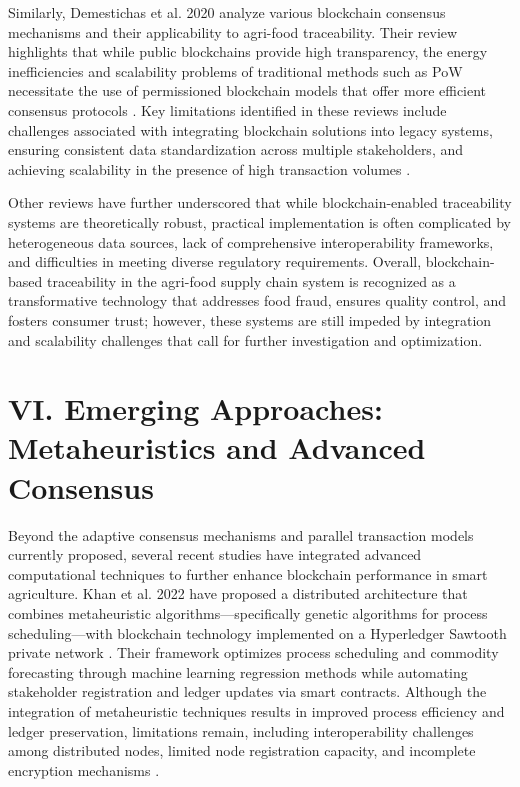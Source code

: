 \documentclass[12pt,onecolumn]{IEEEtran} %
\begin{document}
Similarly, Demestichas et al. 2020 analyze various blockchain consensus mechanisms and their applicability to agri-food traceability. Their review highlights that while public blockchains provide high transparency, the energy inefficiencies and scalability problems of traditional methods such as PoW necessitate the use of permissioned blockchain models that offer more efficient consensus protocols \cite{demestichas2020blockchaininagriculture}. Key limitations identified in these reviews include challenges associated with integrating blockchain solutions into legacy systems, ensuring consistent data standardization across multiple stakeholders, and achieving scalability in the presence of high transaction volumes \cite{demestichas2020blockchaininagriculture}.

Other reviews \cite{demestichas2020blockchaininagriculture, chandan2023achievingunsdgs} have further underscored that while blockchain-enabled traceability systems are theoretically robust, practical implementation is often complicated by heterogeneous data sources, lack of comprehensive interoperability frameworks, and difficulties in meeting diverse regulatory requirements. Overall, blockchain-based traceability in the agri-food supply chain system is recognized as a transformative technology that addresses food fraud, ensures quality control, and fosters consumer trust; however, these systems are still impeded by integration and scalability challenges that call for further investigation and optimization.

\section*{VI. Emerging Approaches: Metaheuristics and Advanced Consensus}

Beyond the adaptive consensus mechanisms and parallel transaction models currently proposed, several recent studies have integrated advanced computational techniques to further enhance blockchain performance in smart agriculture. Khan et al. 2022 have proposed a distributed architecture that combines metaheuristic algorithms---specifically genetic algorithms for process scheduling---with blockchain technology implemented on a Hyperledger Sawtooth private network \cite{khan2022ablockchainand}. Their framework optimizes process scheduling and commodity forecasting through machine learning regression methods while automating stakeholder registration and ledger updates via smart contracts. Although the integration of metaheuristic techniques results in improved process efficiency and ledger preservation, limitations remain, including interoperability challenges among distributed nodes, limited node registration capacity, and incomplete encryption mechanisms \cite{khan2022ablockchainand}.
\end{document}
